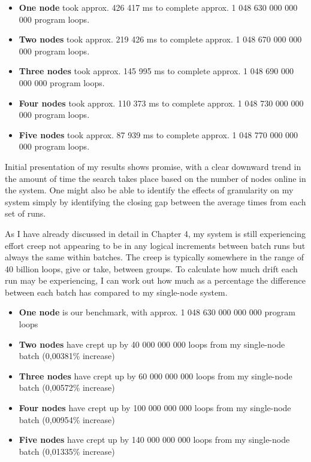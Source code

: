 \begin{itemize}
    \item \textbf{One node} took approx. 426 417 ms to complete approx. 1 048 630 000 000 000 program loops.
    \item \textbf{Two nodes} took approx. 219 426 ms to complete approx. 1 048 670 000 000 000 program loops.
    \item \textbf{Three nodes} took approx. 145 995 ms to complete approx. 1 048 690 000 000 000 program loops.
    \item \textbf{Four nodes} took approx. 110 373 ms to complete approx. 1 048 730 000 000 000 program loops.
    \item \textbf{Five nodes} took approx. 87 939 ms to complete approx. 1 048 770 000 000 000 program loops.
\end{itemize}

Initial presentation of my results shows promise, with a clear downward trend in the amount of time the search takes place based on the number of nodes online in the system. One might also be able to identify the effects of granularity on my system simply by identifying the closing gap between the average times from each set of runs.

As I have already discussed in detail in Chapter 4, my system is still experiencing effort creep not appearing to be in any logical increments between batch runs but always the same within batches. The creep is typically somewhere in the range of 40 billion loops, give or take, between groups. To calculate how much drift each run may be experiencing, I can work out how much as a percentage the difference between each batch has compared to my single-node system.

\begin{itemize}
    \item \textbf{One node} is our benchmark, with approx. 1 048 630 000 000 000 program loops
    \item \textbf{Two nodes} have crept up by 40 000 000 000 loops from my single-node batch (0,00381\% increase)
    \item \textbf{Three nodes} have crept up by 60 000 000 000 loops from my single-node batch (0,00572\% increase)
    \item \textbf{Four nodes} have crept up by 100 000 000 000 loops from my single-node batch (0,00954\% increase)
    \item \textbf{Five nodes} have crept up by 140 000 000 000 loops from my single-node batch (0,01335\% increase)
\end{itemize}

